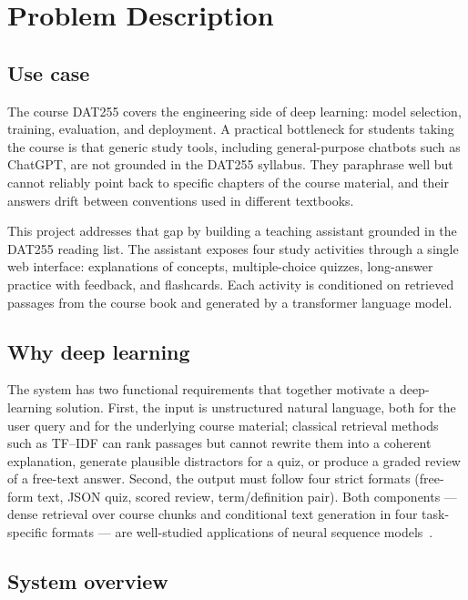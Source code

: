 \section{Problem Description}

\subsection*{Use case}

The course DAT255 covers the engineering side of deep learning: model selection, training,
evaluation, and deployment. A practical bottleneck for students taking the course is that
generic study tools, including general-purpose chatbots such as ChatGPT, are not grounded in the
DAT255 syllabus. They paraphrase well but cannot reliably point back to specific chapters of the
course material, and their answers drift between conventions used in different textbooks.

This project addresses that gap by building a teaching assistant grounded in the DAT255 reading
list. The assistant exposes four study activities through a single web interface:
explanations of concepts, multiple-choice quizzes, long-answer practice with feedback, and
flashcards. Each activity is conditioned on retrieved passages from the course book and
generated by a transformer language model.

\subsection*{Why deep learning}

The system has two functional requirements that together motivate a deep-learning solution.
First, the input is unstructured natural language, both for the user query and for the
underlying course material; classical retrieval methods such as TF--IDF can rank passages but
cannot rewrite them into a coherent explanation, generate plausible distractors for a quiz, or
produce a graded review of a free-text answer. Second, the output must follow four strict
formats (free-form text, JSON quiz, scored review, term/definition pair). Both components ---
dense retrieval over course chunks and conditional text generation in four task-specific
formats --- are well-studied applications of neural sequence models~\cite{vaswani2017attention,
lewis2020retrieval}.

\subsection*{System overview}

